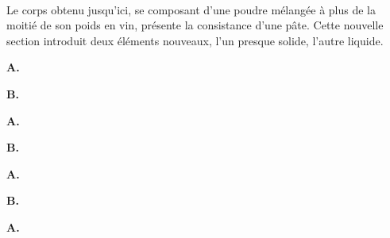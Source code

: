 \documentclass[a4paper, 11pt, oneside, landscape]{article}
\newcommand*\hieroAAAE{}
\newcommand*\hieroAAAM{}
\newcommand*\hieroAAAN{}
\newcommand*\hieroAAAR{}
\newcommand*\hieroAACQ{}
\newcommand*\hieroAADL{}
\newcommand*\hieroAAEP{\raisebox{0.5ex}{}}
\newcommand*\hieroAAFT{}
\newcommand*\hieroAAGA{}
\newcommand*\hieroAAGN{}
\newcommand*\hieroAAGP{}
\newcommand*\hieroAAHC{\raisebox{1ex}{}}
\newcommand*\hieroAAIE{}
\newcommand*\hieroAAIG{}
\newcommand*\hieroAAIT{}
\newcommand*\hieroAAIU{}
\newcommand*\hieroAAJI{}
\newcommand*\hieroAALO{}
\newcommand*\hieroAALP{}
\newcommand*\hieroAAMQ{}
\newcommand*\hieroAANF{}
\newcommand*\hieroAANN{}
\newcommand*\hieroAANO{}
\newcommand*\hieroAANP{}
\newcommand*\hieroAANQ{}
\newcommand*\hieroAANR{}
\newcommand*\hieroAANS{}
\newcommand*\hieroAANT{}
\newcommand*\hieroAANU{}
\newcommand*\hieroAANV{}
\newcommand*\hieroAANW{}
\newcommand*\hieroAANX{}
\newcommand*\hieroAANY{}
\newcommand*\hieroAANZ{}
\newcommand*\hieroAAOA{}
\newcommand*\hieroAAOB{}
\newcommand*\hieroAAOC{}
\newcommand*\hieroAAOD{}
\newcommand*\hieroAAOE{\raisebox{0.6ex}{}}
\newcommand*\hieroAAOI{}
\newcommand*\hieroAAOJ{}
\newcommand*\hieroAAOK{}
\newcommand*\hieroAAOL{}
\newcommand*\hieroAAOM{}
\newcommand*\hieroAAON{}
\newcommand*\hieroAAOO{}
\newcommand*\hieroAAOP{}
\newcommand*\hieroAAOQ{}
\newcommand*\hieroAAOR{}
\newcommand*\hieroAAOS{}
\newcommand*\hieroAAOT{}
\newcommand*\hieroAAOU{}
\newcommand*\hieroAAOV{}
\begin{document}
\paragraph{}
Le corps obtenu jusqu'ici, se composant d'une poudre mélangée à plus de la moitié de son poids en vin, présente la consistance d'une pâte. Cette nouvelle section introduit deux éléments nouveaux, l'un presque solide, l'autre liquide.

\hspace*{10mm}\textbf{A.}\hspace*{5mm} $\hieroAANN\:\hieroAAAN\:\hieroAANO\:\hieroAANO\:\hieroAANP\:\hieroAANQ\:\hieroAANF\:\hieroAAIG\:\hieroAAIT\:\hieroAAMQ$ \hspace*{7mm} $\hieroAANR\:\hieroAANS\:\hieroAAHC\:\hieroAALO$

\hspace*{10mm}\textbf{B.}\hspace*{5mm} $\hieroAAAM\:\hieroAANT\:\hieroAANU\:\hieroAANV\:\hieroAANW\:\hieroAANQ\:\hieroAANF\:\hieroAAIG\:\hieroAAGN\:\hieroAAFT\:\hieroAAMQ$ \hspace*{5mm} $\hieroAANR\:\hieroAANX\:\hieroAANS\:\hieroAALO$

\hspace*{10mm}\textbf{A.}\hspace*{5mm} $\hieroAAIT\:\hieroAAIU\:\hieroAANY\:\hieroAAIT\:\hieroAAMQ\:\hieroAALP$ \hspace*{8mm} $\hieroAAGP\:\hieroAANZ\:\hieroAAOA\:\hieroAAOB\:\hieroAAOC\:\hieroAAOD\:\hieroAAOE$

\hspace*{10mm}\textbf{B.}\hspace*{5mm} $\hieroAAGN\:\hieroAAFT\:\hieroAALP\:\hieroAAGN\:\hieroAAFT\:\hieroAAMQ\:\hieroAALP$

\hspace*{10mm}\textbf{A.}\hspace*{5mm} $\hieroAAOI\:\hieroAAOJ\:\hieroAAOK\:\hieroAAOL\:\hieroAAIT\:\hieroAAIE\:\hieroAACQ\:\hieroAAIG\:\hieroAAOM\:\hieroAAAE\:\hieroAAAR\:\hieroAAIT\:\hieroAAON\:\hieroAAGN$

\hspace*{10mm}\textbf{B.}\hspace*{5mm} $\hieroAAJI\:\hieroAAEP\:\hieroAAOO\:\hieroAAOP\:\hieroAAAM\:\hieroAAAM\:\hieroAADL\:\hieroAAOQ\:\hieroAANQ\:\hieroAAIE\:\hieroAACQ\:\hieroAAIG\:\hieroAAOR\:\hieroAAOS\:\hieroAAOT\:\hieroAAON$

\hspace*{10mm}\textbf{A.}\hspace*{5mm} $\hieroAAAE\:\hieroAAAR\:\hieroAAOU\:\hieroAAMQ\:\hieroAAIU\:\hieroAAGA\:\hieroAAOV$
\end{document}
